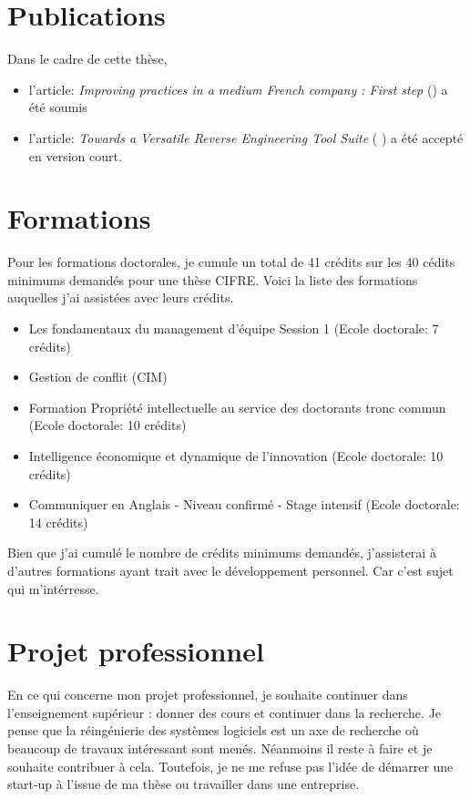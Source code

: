 \documentclass[a4paper]{article}
\begin{document}
\section{Publications}
Dans le cadre de cette thèse,
\begin{itemize}
\item l'article: \textit{Improving practices in a medium French company : First step} (\citet{Houe20a}) a été soumis
\item l'article: \textit{Towards a Versatile Reverse Engineering Tool Suite}  ( \citet{Houe20b}) a été accepté en version court.
\end{itemize}



\section{Formations}
Pour les formations doctorales, je cumule un  total de 41 crédits sur les 40 cédits minimums demandés pour une thèse CIFRE. 
Voici la liste des formations auquelles j'ai assistées  avec leurs crédits.
\begin{itemize}
\item Les fondamentaux du management d’équipe Session 1 (Ecole doctorale: 7 crédits) 
\item Gestion de conflit (CIM) 
\item Formation Propriété intellectuelle au service des doctorants tronc commun (Ecole doctorale: 10 crédits)
\item Intelligence économique et dynamique de l'innovation (Ecole doctorale: 10 crédits)
\item Communiquer en Anglais - Niveau confirmé - Stage intensif (Ecole doctorale: 14 crédits)
\end{itemize}
Bien que j'ai cumulé le nombre de crédits minimums demandés, j'assisterai à d'autres formations ayant trait avec le développement personnel. 
Car c'est sujet qui m'intérresse.
\section{Projet professionnel}
En ce qui concerne mon projet professionnel, je souhaite continuer dans l'enseignement supérieur : donner des cours et continuer dans la recherche.
Je pense que  la réingénierie des systèmes logiciels est un axe de recherche où beaucoup de travaux intéressant sont menés. Néanmoins il reste à faire et je souhaite contribuer à cela.
Toutefois, je ne me refuse pas l'idée de démarrer une start-up à l'issue de ma thèse ou travailler dans une entreprise.

\footnotesize{
 

}
\end{document}
